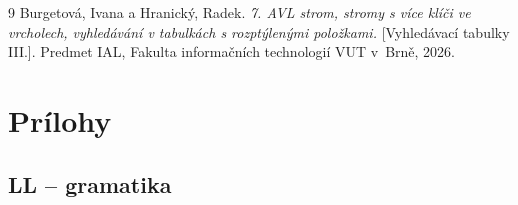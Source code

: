 \documentclass{article}
\begin{document}
\begin{thebibliography}{9}
    Burgetová, Ivana a Hranický, Radek. \emph{7. AVL strom, stromy s více klíči ve vrcholech, vyhledávání v tabulkách s rozptýlenými položkami.} [Vyhledávací tabulky III.]. Predmet IAL, Fakulta informačních technologií VUT v~Brně, 2026.
\end{thebibliography}

\section{Prílohy}
\clearpage
\subsection{LL -- gramatika}
\label{sec:ll-grammar}
\end{document}
